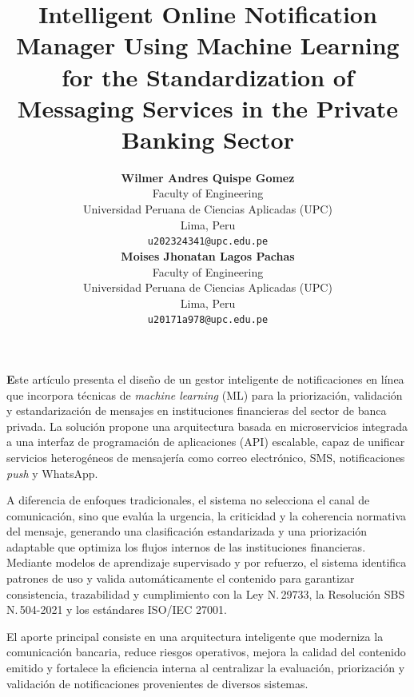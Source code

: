\documentclass[conference]{IEEEtran}
\newenvironment{customabstract}{
  \vspace{1em}
  \noindent{\emph{\textbf{Abstract —}}}\hspace{0.5em}\textbf
}{\par\vspace{1em}}
\begin{document}
\title{Intelligent Online Notification Manager Using Machine Learning for the Standardization of Messaging Services in the Private Banking Sector}

\author{
  {\small
    \begin{minipage}[t]{0.45\textwidth}
      \centering
      \textbf{Wilmer Andres Quispe Gomez}\\
      Faculty of Engineering\\
      Universidad Peruana de Ciencias Aplicadas (UPC)\\
      Lima, Peru\\
      \texttt{u202324341@upc.edu.pe}
    \end{minipage}
    \hfill
    \begin{minipage}[t]{0.45\textwidth}
      \centering
      \textbf{Moises Jhonatan Lagos Pachas}\\
      Faculty of Engineering\\
      Universidad Peruana de Ciencias Aplicadas (UPC)\\
      Lima, Peru\\
      \texttt{u20171a978@upc.edu.pe}
    \end{minipage}
  }
}

\maketitle

\begin{customabstract}
Este art{\'i}culo presenta el dise{\~n}o de un gestor inteligente de notificaciones en l{\'i}nea que incorpora t{\'e}cnicas de \textit{machine learning} (ML) para la priorizaci{\'o}n, validaci{\'o}n y estandarizaci{\'o}n de mensajes en instituciones financieras del sector de banca privada. La soluci{\'o}n propone una arquitectura basada en microservicios integrada a una interfaz de programaci{\'o}n de aplicaciones (API) escalable, capaz de unificar servicios heterog{\'e}neos de mensajer{\'i}a como correo electr{\'o}nico, SMS, notificaciones \textit{push} y WhatsApp. 

A diferencia de enfoques tradicionales, el sistema no selecciona el canal de comunicaci{\'o}n, sino que eval{\'u}a la urgencia, la criticidad y la coherencia normativa del mensaje, generando una clasificaci{\'o}n estandarizada y una priorizaci{\'o}n adaptable que optimiza los flujos internos de las instituciones financieras. Mediante modelos de aprendizaje supervisado y por refuerzo, el sistema identifica patrones de uso y valida autom{\'a}ticamente el contenido para garantizar consistencia, trazabilidad y cumplimiento con la Ley N.\,29733, la Resoluci{\'o}n SBS N.\,504-2021 y los est{\'a}ndares ISO/IEC 27001. 

El aporte principal consiste en una arquitectura inteligente que moderniza la comunicaci{\'o}n bancaria, reduce riesgos operativos, mejora la calidad del contenido emitido y fortalece la eficiencia interna al centralizar la evaluaci{\'o}n, priorizaci{\'o}n y validaci{\'o}n de notificaciones provenientes de diversos sistemas.
\end{customabstract}
\end{document}
